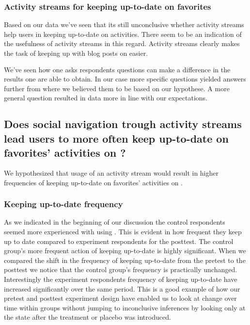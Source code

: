 \subsubsection{Activity streams for keeping up-to-date on favorites}

Based on our data we've seen that its still unconclusive whether activity
streams help users in keeping up-to-date on activities. There seem to be an
indication of the usefulness of activity streams in this regard.
Activity streams clearly makes the task of keeping up with blog posts on
\urort{} easier.

We've seen how
one asks respondents questions can make a difference in the results one
are able to obtain. In our case more specific questions yielded answers
further from where we believed them to be based on our hypothese. A more
general question resulted in data more in line with our expectations.

\subsection{%
  Does social navigation trough activity streams lead users to more often keep
  up-to-date on favorites' activities on \urort{}?
}

We hypothesized that usage of an activity stream would result in higher
frequencies of keeping up-to-date on favorites' activities on \urort{}.

\subsubsection{Keeping up-to-date frequency}

As we indicated in the beginning of our discussion the control respondents
seemed more experienced with using \urort{}. This is evident in how
frequent they keep up to date compared to experiment respondents for the
posttest.%
The control group's more frequent action of keeping up-to-date is highly
significant. When we compared the shift in the frequency of keeping up-to-date
from the pretest to the posttest%
we notice that the control group's frequency is practically unchanged.
Interestingly the experiment respondents frequency of keeping up-to-date have
increased significantly over the same period. This is a good example
of how our pretest and posttest experiment design have enabled us to look
at change over time within groups without jumping to inconclusive inferences
by looking only at the state after the treatment or placebo was introduced.

